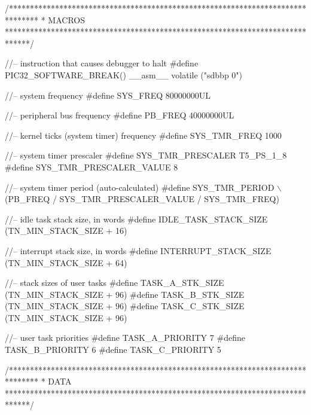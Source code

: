 \begin{DoxyCodeInclude}
\textcolor{comment}{/*******************************************************************************}
\textcolor{comment}{ *    MACROS}
\textcolor{comment}{ ******************************************************************************/}

\textcolor{comment}{//-- instruction that causes debugger to halt}
\textcolor{preprocessor}{#define PIC32\_SOFTWARE\_BREAK()  \_\_asm\_\_ volatile ("sdbbp 0")}

\textcolor{comment}{//-- system frequency}
\textcolor{preprocessor}{#define SYS\_FREQ           80000000UL}

\textcolor{comment}{//-- peripheral bus frequency}
\textcolor{preprocessor}{#define PB\_FREQ            40000000UL}

\textcolor{comment}{//-- kernel ticks (system timer) frequency}
\textcolor{preprocessor}{#define SYS\_TMR\_FREQ       1000}

\textcolor{comment}{//-- system timer prescaler}
\textcolor{preprocessor}{#define SYS\_TMR\_PRESCALER           T5\_PS\_1\_8}
\textcolor{preprocessor}{#define SYS\_TMR\_PRESCALER\_VALUE     8}

\textcolor{comment}{//-- system timer period (auto-calculated)}
\textcolor{preprocessor}{#define SYS\_TMR\_PERIOD              \(\backslash\)}
\textcolor{preprocessor}{   (PB\_FREQ / SYS\_TMR\_PRESCALER\_VALUE / SYS\_TMR\_FREQ)}




\textcolor{comment}{//-- idle task stack size, in words}
\textcolor{preprocessor}{#define IDLE\_TASK\_STACK\_SIZE          (TN\_MIN\_STACK\_SIZE + 16)}

\textcolor{comment}{//-- interrupt stack size, in words}
\textcolor{preprocessor}{#define INTERRUPT\_STACK\_SIZE          (TN\_MIN\_STACK\_SIZE + 64)}

\textcolor{comment}{//-- stack sizes of user tasks}
\textcolor{preprocessor}{#define TASK\_A\_STK\_SIZE    (TN\_MIN\_STACK\_SIZE + 96)}
\textcolor{preprocessor}{#define TASK\_B\_STK\_SIZE    (TN\_MIN\_STACK\_SIZE + 96)}
\textcolor{preprocessor}{#define TASK\_C\_STK\_SIZE    (TN\_MIN\_STACK\_SIZE + 96)}

\textcolor{comment}{//-- user task priorities}
\textcolor{preprocessor}{#define TASK\_A\_PRIORITY    7}
\textcolor{preprocessor}{#define TASK\_B\_PRIORITY    6}
\textcolor{preprocessor}{#define TASK\_C\_PRIORITY    5}



\textcolor{comment}{/*******************************************************************************}
\textcolor{comment}{ *    DATA}
\textcolor{comment}{ ******************************************************************************/}


\end{DoxyCodeInclude}
